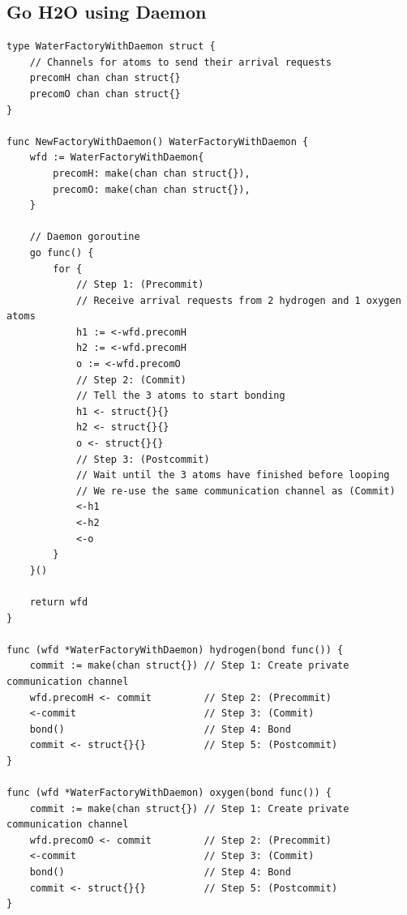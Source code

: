 \documentclass{article}
\begin{document}
\subsection{Go H2O using Daemon}
\begin{lstlisting}[language=Golang]
type WaterFactoryWithDaemon struct {
    // Channels for atoms to send their arrival requests
    precomH chan chan struct{}
    precomO chan chan struct{}
}

func NewFactoryWithDaemon() WaterFactoryWithDaemon {
    wfd := WaterFactoryWithDaemon{
        precomH: make(chan chan struct{}),
        precomO: make(chan chan struct{}),
    }

    // Daemon goroutine
    go func() {
        for {
            // Step 1: (Precommit)
            // Receive arrival requests from 2 hydrogen and 1 oxygen atoms
            h1 := <-wfd.precomH
            h2 := <-wfd.precomH
            o := <-wfd.precomO
            // Step 2: (Commit)
            // Tell the 3 atoms to start bonding
            h1 <- struct{}{}
            h2 <- struct{}{}
            o <- struct{}{}
            // Step 3: (Postcommit)
            // Wait until the 3 atoms have finished before looping
            // We re-use the same communication channel as (Commit)
            <-h1
            <-h2
            <-o
        }
    }()

    return wfd
}

func (wfd *WaterFactoryWithDaemon) hydrogen(bond func()) {
    commit := make(chan struct{}) // Step 1: Create private communication channel
    wfd.precomH <- commit         // Step 2: (Precommit)
    <-commit                      // Step 3: (Commit)
    bond()                        // Step 4: Bond
    commit <- struct{}{}          // Step 5: (Postcommit)
}

func (wfd *WaterFactoryWithDaemon) oxygen(bond func()) {
    commit := make(chan struct{}) // Step 1: Create private communication channel
    wfd.precomO <- commit         // Step 2: (Precommit)
    <-commit                      // Step 3: (Commit)
    bond()                        // Step 4: Bond
    commit <- struct{}{}          // Step 5: (Postcommit)
}
\end{lstlisting}
\end{document}
